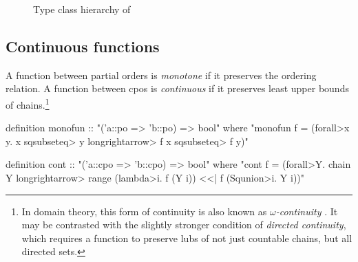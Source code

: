 \begin{figure}
\centering
{}
\caption{Type class hierarchy of }
\label{fig:holcf-subclasses}
\end{figure}

\subsection{Continuous functions}
\label{sec:holcf-cont}

A function between partial orders is \emph{monotone} if it preserves the ordering relation. A function between cpos is \emph{continuous} if it preserves least upper bounds of chains.\footnote{In domain theory, this form of continuity is also known as \emph{$\omega$-continuity} \cite{abramsky94domain}. It may be contrasted with the slightly stronger condition of \emph{directed continuity}, which requires a function to preserve lubs of not just countable chains, but all directed sets.}

\begin{isacode}
definition monofun :: "('a::po => 'b::po) => bool"
  where "monofun f = (\<forall>x y. x \<sqsubseteq> y \<longrightarrow> f x \<sqsubseteq> f y)"
\end{isacode}
\unmedskip
\begin{isacode}
definition cont :: "('a::cpo => 'b::cpo) => bool"
  where "cont f = (\<forall>Y. chain Y \<longrightarrow> range (\<lambda>i. f (Y i)) <<| f (\<Squnion>i. Y i))"
\end{isacode}

